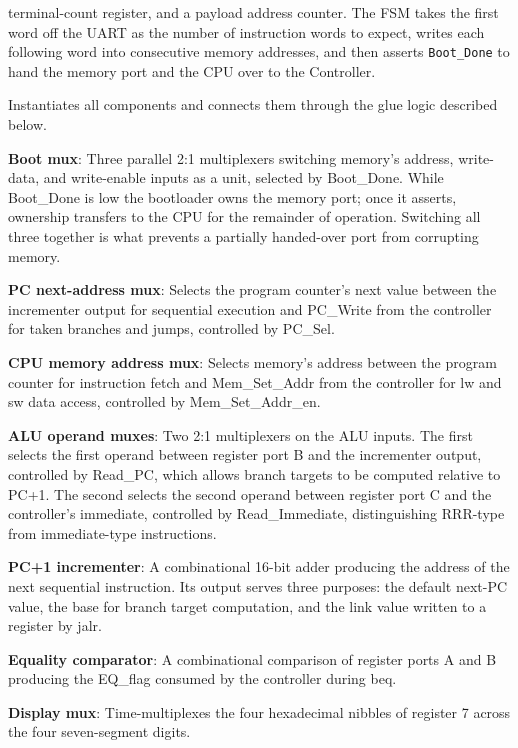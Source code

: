 \documentclass[11pt,letterpaper]{article}
\begin{document}
\begin{description}
    terminal-count register, and a payload address counter. The FSM takes the
    first word off the UART as the number of instruction words to expect, writes
    each following word into consecutive memory addresses, and then asserts
    \texttt{Boot\_Done} to hand the memory port and the CPU over to the
    Controller.
  \item[Top Level] Instantiates all components and connects them through the glue logic described below.
  \item \textbf{Boot mux}: Three parallel 2:1 multiplexers switching memory's address, write-data, and write-enable inputs as a unit, selected by Boot\_Done. While Boot\_Done is low the bootloader owns the memory port; once it asserts, ownership transfers to the CPU for the remainder of operation. Switching all three together is what prevents a partially handed-over port from corrupting memory.

  \item \textbf{PC next-address mux}: Selects the program counter's next value between the incrementer output for sequential execution and PC\_Write from the controller for taken branches and jumps, controlled by PC\_Sel.

  \item \textbf{CPU memory address mux}: Selects memory's address between the program counter for instruction fetch and Mem\_Set\_Addr from the controller for lw and sw data access, controlled by Mem\_Set\_Addr\_en.

  \item \textbf{ALU operand muxes}: Two 2:1 multiplexers on the ALU inputs. The first selects the first operand between register port B and the incrementer output, controlled by Read\_PC, which allows branch targets to be computed relative to PC+1. The second selects the second operand between register port C and the controller's immediate, controlled by Read\_Immediate, distinguishing RRR-type from immediate-type instructions.

  \item \textbf{PC+1 incrementer}: A combinational 16-bit adder producing the address of the next sequential instruction. Its output serves three purposes: the default next-PC value, the base for branch target computation, and the link value written to a register by jalr.

  \item \textbf{Equality comparator}: A combinational comparison of register ports A and B producing the EQ\_flag consumed by the controller during beq.

  \item \textbf{Display mux}: Time-multiplexes the four hexadecimal nibbles of register 7 across the four seven-segment digits.
\end{description}
\end{document}
